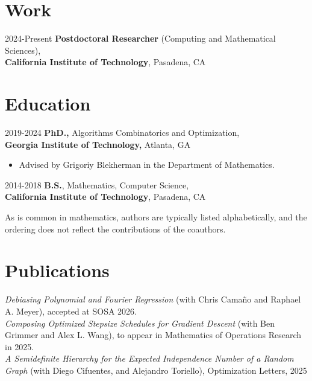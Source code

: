 \documentclass[margin]{res}
\begin{document}
 
 

\begin{resume} 
\section{Work}
2024-{\small Present} {\bf Postdoctoral Researcher} (Computing and Mathematical Sciences),\\ {\bf California Institute of Technology}, Pasadena, CA

\section{Education} 
2019-2024 {\bf PhD.,} Algorithms Combinatorics and Optimization,\\ {\bf Georgia Institute of Technology,} Atlanta, GA
 
 \begin{itemize} \itemsep -2pt  %
 \item Advised by Grigoriy Blekherman in the Department of Mathematics.
 \end{itemize}

2014-2018 {\bf B.S.}, Mathematics, Computer Science,\\ {\bf California Institute of Technology}, Pasadena, CA

{As is common in mathematics, authors are typically listed alphabetically, and the ordering does not reflect the contributions of the coauthors.}
\section{Publications}
\emph{Debiasing Polynomial and Fourier Regression} (with Chris Camaño and Raphael A. Meyer), accepted at SOSA 2026.\\

\emph{Composing Optimized Stepsize Schedules for Gradient Descent} (with Ben Grimmer and Alex L. Wang), to appear in Mathematics of Operations Research in 2025.\\

\emph{A Semidefinite Hierarchy for the Expected Independence Number of a Random Graph} (with Diego Cifuentes, and Alejandro Toriello), Optimization Letters, 2025\\


\end{resume}
\end{document}
